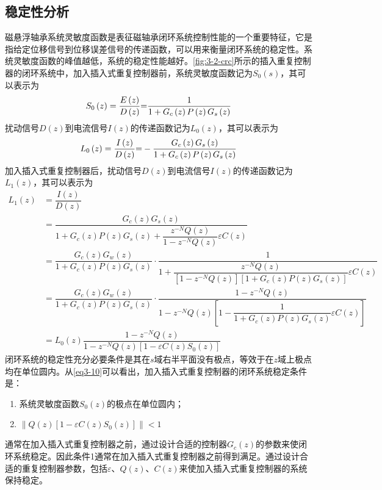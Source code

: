 \documentclass[
  lang=cn,
  degree=master,
  openany,oneside
]{nuaathesis}
\begin{document}
\subsection{稳定性分析}
磁悬浮轴承系统灵敏度函数是表征磁轴承闭环系统控制性能的一个重要特征，它是指给定位移信号到位移误差信号的传递函数，可以用来衡量闭环系统的稳定性。系统灵敏度函数的峰值越低，系统的稳定性能越好。\autoref{fig:3-2-crc}所示的插入重复控制器的闭环系统中，加入插入式重复控制器前，系统灵敏度函数记为$S_0(s)$，其可以表示为
\begin{equation}
{S_0}\left( z \right) = {{E\left( z \right)} \over {D\left( z \right)}}{\rm{ = }}{1 \over {1 + {G_c}\left( z \right)P\left( z \right){G_s}\left( z \right)}}
\end{equation}
扰动信号$D(z)$到电流信号$I(z)$的传递函数记为$L_0(z)$，其可以表示为
\begin{equation}
{L_0}\left( z \right) = {{I\left( z \right)} \over {D\left( z \right)}}{\rm{ = }} - {{{G_c}\left( z \right){G_s}\left( z \right)} \over {1 + {G_c}\left( z \right)P\left( z \right){G_s}\left( z \right)}}
\end{equation}
加入插入式重复控制器后，扰动信号$D(z)$到电流信号$I(z)$的传递函数记为$L_1(z)$，其可以表示为
\begin{equation}
\label{eq3-10}
\begin{aligned}
L_1(z)
&=\dfrac{I(z)}{D(z)}\\
&=\dfrac{G_c(z)G_s(z)}{1+G_c(z)P(z)G_s(z)+\dfrac{z^{-N}Q(z)}{1-z^{-N}Q(z)}\varepsilon C(z)}\\
&=\dfrac{G_c(z)G_w(z)}{1+G_c(z)P(z)G_s(z)}\cdot \dfrac{1}{1+\dfrac{z^{-N}Q(z)}{[1-z^{-N}Q(z)][1+G_c(z)P(z)G_s(z)]}\varepsilon C(z)}\\
&=\dfrac{G_c(z)G_w(z)}{1+G_c(z)P(z)G_s(z)}\cdot \dfrac{1-z^{-N}Q(z)}{1-z^{-N}Q(z)\left[1-\dfrac{1}{1+G_c(z)P(z)G_s(z)}\varepsilon C(z)\right]}\\
&=L_0(z)\dfrac{1-z^{-N}Q(z)}{1-z^{-N}Q(z)[1-\varepsilon C(z)S_0(z)]}
\end{aligned}
\end{equation}
闭环系统的稳定性充分必要条件是其在$s$域右半平面没有极点，等效于在$z$域上极点均在单位圆内。从\autoref{eq3-10}可以看出，加入插入式重复控制器的闭环系统稳定条件是：
\begin{enumerate}
	\item 系统灵敏度函数$S_0(z)$的极点在单位圆内；
	\item $\left\| Q(z)[1 - \varepsilon C(z)S_0(z)] \right\| < 1$
\end{enumerate}
通常在加入插入式重复控制器之前，通过设计合适的控制器$G_c(z)$的参数来使闭环系统稳定。因此条件1通常在加入插入式重复控制器之前得到满足。通过设计合适的重复控制器参数，包括$\varepsilon$、$Q(z)$、$C(z)$来使加入插入式重复控制器的系统保持稳定。
\end{document}
